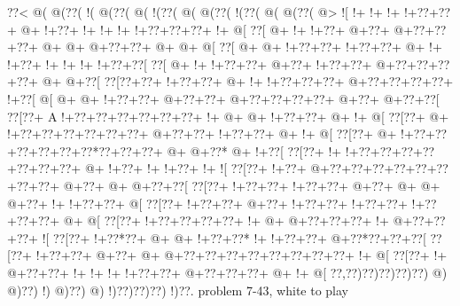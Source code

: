 \vbox{\vbox{\goo
\0??<\- @(\- @(\0??(\- !(\- @(\0??(\- @(\- !(\0??(\- @(\- @(\0??(\- !(\0??(\- @(\- @(\0??(\- @>
\- ![\- !+\- !+\- !+\- !+\0??+\0??+\- @+\- !+\0??+\- !+\- !+\- !+\- !+\0??+\0??+\0??+\- !+\- @[
\0??[\- @+\- !+\- !+\0??+\- @+\0??+\- @+\0??+\0??+\0??+\- @+\- @+\- @+\0??+\0??+\- @+\- @+\- @[
\0??[\- @+\- @+\- !+\0??+\0??+\- !+\0??+\0??+\- @+\- !+\- !+\0??+\- !+\- !+\- !+\- !+\0??+\0??[
\0??[\- @+\- !+\- !+\0??+\0??+\- @+\0??+\- !+\0??+\0??+\- @+\0??+\0??+\0??+\0??+\- @+\- @+\0??[
\0??[\0??+\0??+\- !+\0??+\0??+\- @+\- !+\- !+\0??+\0??+\0??+\- @+\0??+\0??+\0??+\0??+\- !+\0??[
\- @[\- @+\- @+\- !+\0??+\0??+\- @+\0??+\0??+\- @+\0??+\0??+\0??+\0??+\- @+\0??+\- @+\0??+\0??[
\0??[\0??+\!  A\- !+\0??+\0??+\0??+\0??+\0??+\0??+\- !+\- @+\- @+\- !+\0??+\0??+\- @+\- !+\- @[
\0??[\0??+\- @+\- !+\0??+\0??+\0??+\0??+\0??+\0??+\- @+\0??+\0??+\- !+\0??+\0??+\- @+\- !+\- @[
\0??[\0??+\- @+\- !+\0??+\0??+\0??+\0??+\0??+\0??*\0??+\0??+\0??+\- @+\- @+\0??*\- @+\- !+\0??[
\0??[\0??+\- !+\- !+\0??+\0??+\0??+\0??+\0??+\0??+\0??+\- @+\- !+\0??+\- !+\- !+\0??+\- !+\- ![
\0??[\0??+\- !+\0??+\- @+\0??+\0??+\0??+\0??+\0??+\0??+\0??+\0??+\- @+\0??+\- @+\- @+\0??+\0??[
\0??[\0??+\- !+\0??+\0??+\- !+\0??+\0??+\- @+\0??+\- @+\- @+\- @+\0??+\- !+\- !+\0??+\0??+\- @[
\0??[\0??+\- !+\0??+\0??+\- @+\0??+\- !+\0??+\0??+\- !+\0??+\0??+\- !+\0??+\0??+\0??+\- @+\- @[
\0??[\0??+\- !+\0??+\0??+\0??+\0??+\- !+\- @+\- @+\0??+\0??+\0??+\- !+\- @+\0??+\0??+\0??+\- ![
\0??[\0??+\- !+\0??*\0??+\- @+\- @+\- !+\0??+\0??*\- !+\- !+\0??+\0??+\- @+\0??*\0??+\0??+\0??[
\0??[\0??+\- !+\0??+\0??+\- @+\0??+\- @+\- @+\0??+\0??+\0??+\0??+\0??+\0??+\0??+\0??+\- !+\- @[
\0??[\0??+\- !+\- @+\0??+\0??+\- !+\- !+\- !+\- !+\0??+\0??+\- @+\0??+\0??+\0??+\- @+\- !+\- @[
\0??,\0??)\0??)\0??)\0??)\0??)\- @)\- @)\0??)\- !)\- @)\0??)\- @)\- !)\0??)\0??)\0??)\- !)\0??.
}
\hfil problem 7-43, white to play\hfil\break
}

